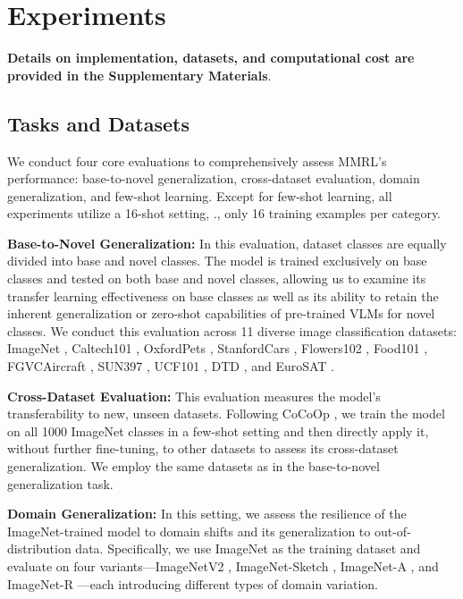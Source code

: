 \section{Experiments}
\label{sec:experiments}
\textbf{Details on implementation, datasets, and computational cost are provided in the Supplementary Materials}.

\subsection{Tasks and Datasets}
We conduct four core evaluations to comprehensively assess MMRL's performance: base-to-novel generalization, cross-dataset evaluation, domain generalization, and few-shot learning. Except for few-shot learning, all experiments utilize a 16-shot setting, \ie., only 16 training examples per category.

\noindent \textbf{Base-to-Novel Generalization:} 
In this evaluation, dataset classes are equally divided into base and novel classes. The model is trained exclusively on base classes and tested on both base and novel classes, allowing us to examine its transfer learning effectiveness on base classes as well as its ability to retain the inherent generalization or zero-shot capabilities of pre-trained VLMs for novel classes. We conduct this evaluation across 11 diverse image classification datasets: ImageNet \cite{imagenet}, Caltech101 \cite{caltech101}, OxfordPets \cite{oxford_pets}, StanfordCars \cite{stanford_cars}, Flowers102 \cite{flowers102}, Food101 \cite{food101}, FGVCAircraft \cite{fgvc_aircraft}, SUN397 \cite{sun397}, UCF101 \cite{ucf101}, DTD \cite{dtd}, and EuroSAT \cite{eurosat}.

\noindent \textbf{Cross-Dataset Evaluation:} This evaluation measures the model’s transferability to new, unseen datasets. Following CoCoOp \cite{cocoop}, we train the model on all 1000 ImageNet classes in a few-shot setting and then directly apply it, without further fine-tuning, to other datasets to assess its cross-dataset generalization. We employ the same datasets as in the base-to-novel generalization task.

\noindent \textbf{Domain Generalization:} In this setting, we assess the resilience of the ImageNet-trained model to domain shifts and its generalization to out-of-distribution data. Specifically, we use ImageNet as the training dataset and evaluate on four variants—ImageNetV2 \cite{imagenetv2}, ImageNet-Sketch \cite{imagenet_sketch}, ImageNet-A \cite{imagenet_a}, and ImageNet-R \cite{imagenet_r}—each introducing different types of domain variation.

